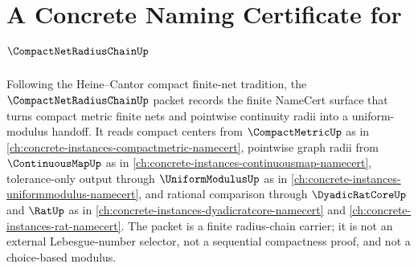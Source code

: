 \chapter{A Concrete Naming Certificate for $\CompactNetRadiusChainUp$}
\label{ch:concrete-instances-compact-net-radius-chain-namecert}

Following the Heine--Cantor compact finite-net tradition, the $\CompactNetRadiusChainUp$ packet records the finite NameCert surface that turns compact metric finite nets and pointwise continuity radii into a uniform-modulus handoff. It reads compact centers from $\CompactMetricUp$ as in \autoref{ch:concrete-instances-compactmetric-namecert}, pointwise graph radii from $\ContinuousMapUp$ as in \autoref{ch:concrete-instances-continuousmap-namecert}, tolerance-only output through $\UniformModulusUp$ as in \autoref{ch:concrete-instances-uniformmodulus-namecert}, and rational comparison through $\DyadicRatCoreUp$ and $\RatUp$ as in \autoref{ch:concrete-instances-dyadicratcore-namecert} and \autoref{ch:concrete-instances-rat-namecert}. The packet is a finite radius-chain carrier; it is not an external Lebesgue-number selector, not a sequential compactness proof, and not a choice-based modulus.

